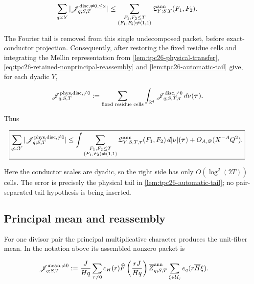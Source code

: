 \begin{equation}
 \sum_{q\asymp Y}
 |\mathscr J_{q;S,T}^{\rm disc,\ne0,\le\omega}|
 \le
 \sum_{\substack{F_1,F_2\le T\\
                  (F_1,F_2)\ne(1,1)}}
 \mathfrak L^{\rm ann}_{Y;S,T}(F_1,F_2).
 \label{eq:tpc26-retained-nonprincipal-reassembly}
\end{equation}

The Fourier tail is removed from this single undecomposed packet,
before exact-conductor projection.  Consequently, after restoring the
fixed residue cells and integrating the Mellin representation from
\cref{lem:tpc26-physical-transfer}, \eqref{eq:tpc26-retained-nonprincipal-reassembly}
and \cref{lem:tpc26-automatic-tail} give, for each dyadic \(Y\),

\[
 \mathscr J_{q;S,T}^{\rm phys,disc,\ne0}
 :=
 \sum_{\text{fixed residue cells}}
 \int_{\mathbb R^4}
 \mathscr J_{q;S,T,\boldsymbol\tau}^{\rm disc,\ne0}
 \,d\nu(\boldsymbol\tau).
\]

Thus

\begin{equation}
 \boxed{
 \sum_{q\asymp Y}
 |\mathscr J_{q;S,T}^{\rm phys,disc,\ne0}|
 \le
 \int
 \sum_{\substack{F_1,F_2\le T\\
                  (F_1,F_2)\ne(1,1)}}
 \mathfrak L^{\rm ann}_{Y;S,T,\boldsymbol\tau}(F_1,F_2)
 \,d|\nu|(\boldsymbol\tau)
 +O_{A,\mathscr D}(X^{-A}Q^2).}
 \label{eq:tpc26-nonprincipal-reassembly}
\end{equation}

Here the conductor scales are dyadic, so the right side has only
\(O(\log^2(2T))\) cells.  The error is precisely the physical tail in
\cref{lem:tpc26-automatic-tail}; no pair-separated tail hypothesis is
being inserted.

\subsection{Principal mean and reassembly}

For one divisor pair the principal multiplicative character produces
the unit-fiber mean.  In the notation above its assembled nonzero
packet is

\begin{align}
 \mathscr J_{q;S,T}^{\rm mean,\ne0}
 :={}&\frac{J}{Hq}\sum_{r\ne0}c_H(r)
 \widehat F\left(\frac{rJ}{Hq}\right)
 \overline Z_{q;S,T}^{\rm ann}
 \sum_{\xi\in\mathcal U_q}e_q(r\overline H\xi).
 \label{eq:tpc26-annular-mean-packet}
\end{align}

